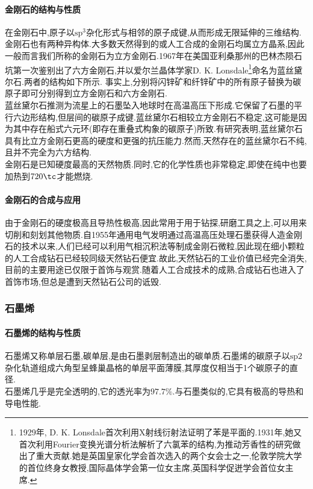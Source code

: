\documentclass[draft]{ctexart}
\begin{document}
\paragraph{金刚石的结构与性质}
在金刚石中,原子以$\text{sp}^3$杂化形式与相邻的原子成键,从而形成无限延伸的三维结构.金刚石也有两种异构体.大多数天然得到的或人工合成的金刚石均属立方晶系,因此一般而言我们所称的金刚石为立方金刚石.1967年在美国亚利桑那州的巴林杰陨石坑第一次鉴别出了六方金刚石,并以爱尔兰晶体学家D. K. Lonsdale\footnote{1929年, D. K. Lonsdale首次利用X射线衍射法证明了苯是平面的.1931年,她又首次利用Fourier变换光谱分析法解析了六氯苯的结构,为推动芳香性的研究做出了重大贡献.她是英国皇家化学会首次选入的两个女会士之一,伦敦学院大学的首位终身女教授,国际晶体学会第一位女主席,英国科学促迸学会首位女主席.}命名为蓝丝黛尔石.两者的结构如下所示.
事实上,分别将闪锌矿和纤锌矿中的所有原子替换为碳原子即可分别得到立方金刚石和六方金刚石.\\
\indent 蓝丝黛尔石推测为流星上的石墨坠入地球时在高温高压下形成.它保留了石墨的平行六边形结构,但层间的碳原子成键.蓝丝黛尔石相较立方金刚石不稳定,这可能是因为其中存在船式六元环(即存在重叠式构象的碳原子)所致.有研究表明,蓝丝黛尔石具有比立方金刚石更高的硬度和更强的抗压能力.然而,天然存在的蓝丝黛尔石不纯,且并不完全为六方结构.\\
\indent 金刚石是已知硬度最高的天然物质.同时,它的化学性质也非常稳定,即使在纯中也要加热到$720\tc$才能燃烧.
\paragraph{金刚石的合成与应用}
由于金刚石的硬度极高且导热性极高,因此常用于用于钻探,研磨工具之上,可以用来切削和刻划其他物质.自1955年通用电气发明通过高温高压处理石墨获得人造金刚石的技术以来,人们已经可以利用气相沉积法等制成金刚石微粒,因此现在细小颗粒的人工合成钻石已经较同级天然钻石便宜.故此,天然钻石的工业价值已经完全消失,目前的主要用途已仅限于首饰与观赏.随着人工合成技术的成熟,合成钻石也进入了首饰市场,但总是遭到天然钻石公司的诋毁.
\subsubsection{石墨烯}
\paragraph{石墨烯的结构与性质}
石墨烯又称单层石墨,碳单层,是由石墨剥层制造出的碳单质.石墨烯的碳原子以$\text{sp}2$杂化轨道组成六角型呈蜂巢晶格的单层平面薄膜,其厚度仅相当于1个碳原子的直径.\\
\indent 石墨烯几乎是完全透明的,它的透光率为$97.7\%$.与石墨类似的,它具有极高的导热和导电性能.
\end{document}
